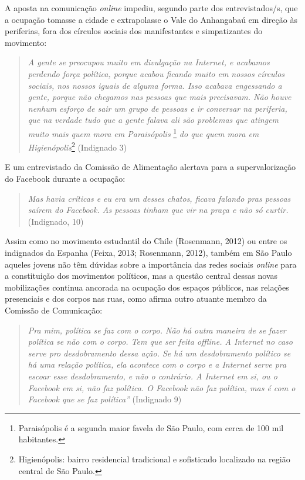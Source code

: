 A aposta na comunicação \emph{online} impediu, segundo parte dos
entrevistados/s, que a ocupação tomasse a cidade e extrapolasse o Vale
do Anhangabaú em direção às periferias, fora dos círculos sociais dos
manifestantes e simpatizantes do movimento:

\begin{quote}
\emph{A gente se preocupou muito em divulgação na Internet, e acabamos
perdendo força política, porque acabou ficando muito em nossos círculos
sociais, nos nossos iguais de alguma forma. Isso acabava engessando a
gente, porque não chegamos nas pessoas que mais precisavam. Não houve
nenhum esforço de sair um grupo de pessoas e ir conversar na periferia,
que na verdade tudo que a gente falava ali são problemas que atingem
muito mais quem mora em Paraisópolis} \footnote{Paraisópolis é a segunda
  maior favela de São Paulo, com cerca de 100 mil habitantes.} \emph{do
que quem mora em Higienópolis}\footnote{Higienópolis: bairro residencial
  tradicional e sofisticado localizado na região central de São Paulo.}
(Indignado 3)
\end{quote}

E um entrevistado da Comissão de Alimentação alertava para a
supervalorização do Facebook durante a ocupação:

\begin{quote}
\emph{Mas havia críticas e eu era um desses chatos, ficava falando pras
pessoas saírem do Facebook. As pessoas tinham que vir na praça e não só
curtir.} (Indignado, 10)
\end{quote}

Assim como no movimento estudantil do Chile (Rosenmann, 2012) ou entre
os indignados da Espanha (Feixa, 2013; Rosenmann, 2012), também em São
Paulo aqueles jovens não têm dúvidas sobre a importância das redes
sociais \emph{online} para a constituição dos movimentos políticos, mas
a questão central dessas novas mobilizações continua ancorada na
ocupação dos espaços públicos, nas relações presenciais e dos corpos nas
ruas, como afirma outro atuante membro da Comissão de Comunicação:

\begin{quote}
\emph{Pra mim, política se faz com o corpo. Não há outra maneira de se
fazer política se não com o corpo. Tem que ser feita \emph{offline}. A
Internet no caso serve pro desdobramento dessa ação. Se há um
desdobramento político se há uma relação política, ela acontece com o
corpo e a Internet serve pra escoar esse desdobramento, e não o
contrário. A Internet em si, ou o Facebook em si, não faz política. O
Facebook não faz política, mas é com o Facebook que se faz política''}
(Indignado 9)
\end{quote}


